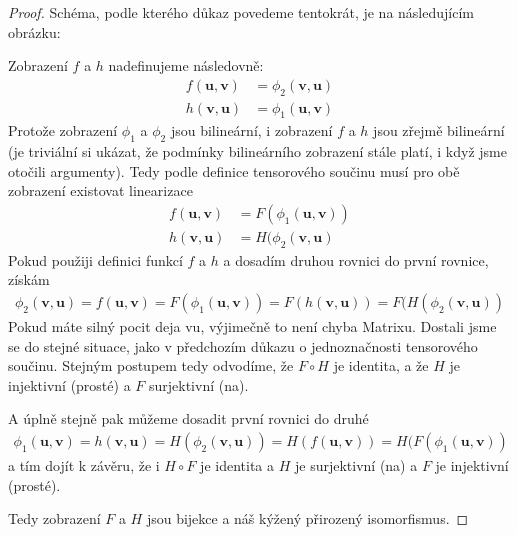 \documentclass[a5paper,12pt]{amsbook}
\theoremstyle{definition}
\newcommand{\myvec}[1]{\bm{#1}}
\begin{document}
\begin{proof}
Schéma, podle kterého důkaz povedeme tentokrát, je na následujícím obrázku:
\begin{center}

\end{center}
Zobrazení $f$ a $h$ nadefinujeme následovně:
\begin{equation*}
\begin{split}
f(\myvec{u}, \myvec{v}) &= \phi_2(\myvec{v}, \myvec{u}) \\
h(\myvec{v}, \myvec{u}) &= \phi_1(\myvec{u}, \myvec{v})
\end{split}
\end{equation*}
Protože zobrazení $\phi_1$ a $\phi_2$ jsou bilineární, i zobrazení $f$ a $h$ jsou zřejmě
bilineární (je triviální si ukázat, že podmínky bilineárního zobrazení stále platí, i když
jsme otočili argumenty). Tedy podle definice tensorového součinu musí pro obě zobrazení
existovat linearizace
\begin{equation*}
\begin{split}
f(\myvec{u}, \myvec{v}) &= F(\phi_1(\myvec{u}, \myvec{v})) \\
h(\myvec{v}, \myvec{u}) &= H(\phi_2(\myvec{v}, \myvec{u})
\end{split}
\end{equation*}
Pokud použiji definici funkcí $f$ a $h$ a dosadím druhou rovnici do první rovnice, získám
\begin{equation*}
\begin{split}
\phi_2(\myvec{v}, \myvec{u}) = f(\myvec{u}, \myvec{v}) = F(\phi_1(\myvec{u}, \myvec{v})) 
  = F(h(\myvec{v}, \myvec{u})) = F(H(\phi_2(\myvec{v}, \myvec{u}))
\end{split}
\end{equation*}
Pokud máte silný pocit deja vu, výjimečně to není chyba Matrixu. Dostali jsme se do stejné
situace, jako v předchozím důkazu o jednoznačnosti tensorového součinu. Stejným postupem
tedy odvodíme, že $F \circ H$ je identita, a že $H$ je injektivní (prosté) a $F$ surjektivní
(na).

A úplně stejně pak můžeme dosadit první rovnici do druhé
\begin{equation*}
\begin{split}
\phi_1(\myvec{u}, \myvec{v}) = h(\myvec{v}, \myvec{u}) = H(\phi_2(\myvec{v}, \myvec{u}))
  = H(f(\myvec{u}, \myvec{v})) = H(F(\phi_1(\myvec{u}, \myvec{v}))
\end{split}
\end{equation*}
a tím dojít k závěru, že i $H \circ F$ je identita a $H$ je surjektivní (na) a $F$ je
injektivní (prosté).

Tedy zobrazení $F$ a $H$ jsou bijekce a náš kýžený přirozený isomorfismus.
\end{proof}
\end{document}

